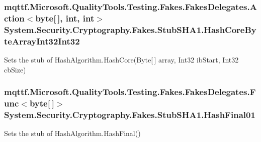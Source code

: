 \hypertarget{class_system_1_1_security_1_1_cryptography_1_1_fakes_1_1_stub_s_h_a1_a6e2738fa93883f2e9f2a6e5bfee64f58}{
\subsubsection[{Hash\-Core\-Byte\-Array\-Int32\-Int32}]{\setlength{\rightskip}{0pt plus 5cm}mqttf.\-Microsoft.\-Quality\-Tools.\-Testing.\-Fakes.\-Fakes\-Delegates.\-Action$<$byte\mbox{[}$\,$\mbox{]}, int, int$>$ System.\-Security.\-Cryptography.\-Fakes.\-Stub\-S\-H\-A1.\-Hash\-Core\-Byte\-Array\-Int32\-Int32}}\label{class_system_1_1_security_1_1_cryptography_1_1_fakes_1_1_stub_s_h_a1_a6e2738fa93883f2e9f2a6e5bfee64f58}


Sets the stub of Hash\-Algorithm.\-Hash\-Core(\-Byte\mbox{[}$\,$\mbox{]} array, Int32 ib\-Start, Int32 cb\-Size)

\hypertarget{class_system_1_1_security_1_1_cryptography_1_1_fakes_1_1_stub_s_h_a1_a991de644942c743e62d2d9c21c04fad0}{
\subsubsection[{Hash\-Final01}]{\setlength{\rightskip}{0pt plus 5cm}mqttf.\-Microsoft.\-Quality\-Tools.\-Testing.\-Fakes.\-Fakes\-Delegates.\-Func$<$byte\mbox{[}$\,$\mbox{]}$>$ System.\-Security.\-Cryptography.\-Fakes.\-Stub\-S\-H\-A1.\-Hash\-Final01}}\label{class_system_1_1_security_1_1_cryptography_1_1_fakes_1_1_stub_s_h_a1_a991de644942c743e62d2d9c21c04fad0}


Sets the stub of Hash\-Algorithm.\-Hash\-Final()

